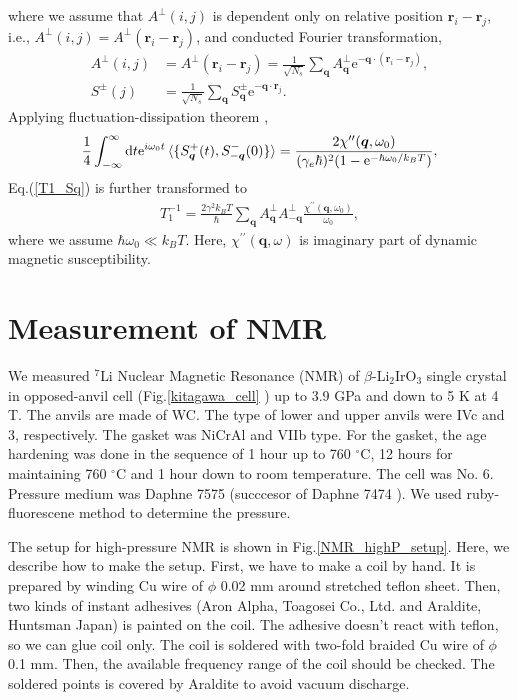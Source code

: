 \documentclass[a4,10.5pt]{report}
\begin{document}
where we assume that $A^\perp (i, j)$ is dependent only on relative position $\bm{r}_i - \bm{r}_j$, i.e., $A^\perp (i, j) = A^\perp(\bm{r}_i - \bm{r}_j)$,
and conducted Fourier transformation,
\begin{align}
A^\perp (i, j) &= A^\perp(\bm{r}_i - \bm{r}_j) = \frac{1}{\sqrt{N_s}}\sum_{\bm{q}}A^\perp_{\bm{q}}\mathrm{e}^{-\bm{q}\cdot(\bm{r}_i - \bm{r}_j)},\\
S^\pm (j) &= \frac{1}{\sqrt{N_s}}\sum_{\bm{q}} S^\pm_{\bm{q}}\mathrm{e}^{-\bm{q}\cdot\bm{r}_j}.
\end{align}
Applying fluctuation-dissipation theorem \cite{Kitaoka}, 
\begin{align}
\frac{1}{4}\int^{\infty}_{-\infty}\mathrm{d}t\mathrm{e}^{i\omega_0t} \braket{\{S^+_{\bm{q}}(t),S^-_{-\bm{q}}(0)\}} 
= \frac{2\chi^{\prime\prime}(\bm{q}, \omega_0)}{(\gamma_e\hbar)^2(1-\mathrm{e}^{-\hbar\omega_0/k_BT})},
\end{align}
Eq.(\ref{T1_Sq}) is further transformed to
\begin{align}
\label{T1_chi}
T^{-1}_1 = \frac{2\gamma^2k_BT}{\hbar}\sum_{\bm{q}}A^{\perp}_{\bm{q}}A^\perp_{-\bm{q}} \frac{\chi^{\prime\prime}(\bm{q}, \omega_0)}{\omega_0},
\end{align}
where we assume $\hbar\omega_0 \ll k_BT$. 
Here, $\chi^{\prime\prime}(\bm{q}, \omega)$ is imaginary part of dynamic magnetic susceptibility.


\section{Measurement of NMR}
We measured ${}^7$Li Nuclear Magnetic Resonance (NMR) of $\beta$-Li$_2$IrO$_3$ single crystal 
in opposed-anvil cell (Fig.\ref{kitagawa_cell} \cite{Kitagawa2010}) up to 3.9 GPa and down to 5 K  at 4 T. 
The anvils are made of WC.
The type of lower and upper anvils were IVc and 3, respectively.
The gasket was NiCrAl and VIIb type.
For the gasket, the age hardening was done in the sequence of 1 hour up to 760 ${}^\circ$C, 12 hours for maintaining 760 ${}^\circ$C and 1 hour down to room temperature.
The cell was No. 6. 
Pressure medium was Daphne 7575 (succcesor of Daphne 7474 \cite{Murata2008}). 
We used ruby-fluorescene method to determine the pressure.

The setup for high-pressure NMR is shown in Fig.\ref{NMR_highP_setup}.
Here, we describe how to make the setup.
First, we have to make a coil by hand.
It is prepared by winding Cu wire of $\phi$ 0.02 mm around stretched teflon sheet.
Then, two kinds of instant adhesives (Aron Alpha, Toagosei Co., Ltd. and Araldite, Huntsman Japan) is painted on the coil.
The adhesive doesn't react with teflon, so we can glue coil only.
The coil is soldered with two-fold braided Cu wire of $\phi$ 0.1 mm.
Then, the available frequency range of the coil should be checked.
The soldered points is covered by Araldite to avoid vacuum discharge.
\end{document}
